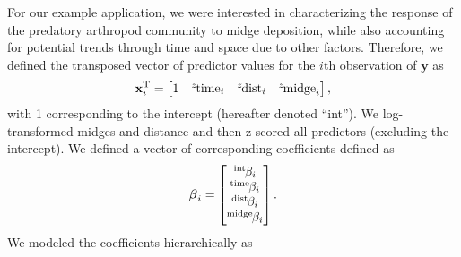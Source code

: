 For our example application,
we were interested in characterizing the response of the predatory arthropod
community to midge deposition, while also accounting for potential trends through
time and space due to other factors.
Therefore, we defined the transposed vector of predictor values for the $i$th observation
of $\mathbf{y}$ as
%
\begin{equation} \label{eq:x-vec}
    \mathbf{x}_i^\text{T} = \begin{bmatrix}
        1 &
        {}^z\hspace*{-1pt}\text{time}_i &
        {}^z\hspace*{-1pt}\text{dist}_i &
        {}^z\hspace*{-1pt}\text{midge}_i
    \end{bmatrix}\text{,}
\end{equation}
%
\noindent with 1 corresponding to the intercept (hereafter denoted ``int'').
We log-transformed midges and distance and then z-scored all predictors
(excluding the intercept).
We defined a vector of corresponding coefficients defined as
%
\begin{equation} \label{eq:beta-vec}
{\boldsymbol\beta}_i = \begin{bmatrix}
    {}^\text{int}\hspace*{-1pt}\beta_i \\
    {}^\text{time}\hspace*{-1pt}\beta_i \\
    {}^\text{dist}\hspace*{-1pt}\beta_i \\
    {}^\text{midge}\hspace*{-1pt}\beta_i
    \end{bmatrix}\text{.}
\end{equation}
%
\noindent We modeled the coefficients hierarchically \citep[following][]{Jackson2012} as
%
